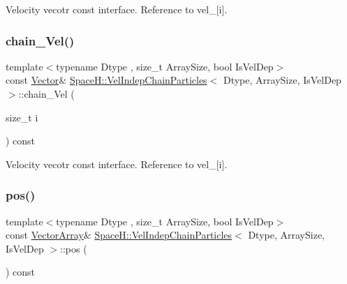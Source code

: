 Velocity vecotr const interface. Reference to vel\+\_\+\mbox{[}i\mbox{]}. 

\mbox{\label{class_space_h_1_1_vel_indep_chain_particles_a05d9529a4ee452b4c15efe92584a6d25}} 
\subsubsection{\texorpdfstring{chain_\+Vel()}{chainVel()}\hspace{0.1cm}{\footnotesize\ttfamily [4/4]}}
{\footnotesize\ttfamily template$<$typename Dtype , size\+\_\+t Array\+Size, bool Is\+Vel\+Dep$>$ \\
const \mbox{\hyperlink{class_space_h_1_1_vel_indep_particles_a61bbcfdb0dc7f99f3c68af69a755c935}{Vector}}\& \mbox{\hyperlink{class_space_h_1_1_vel_indep_chain_particles}{Space\+H\+::\+Vel\+Indep\+Chain\+Particles}}$<$ Dtype, Array\+Size, Is\+Vel\+Dep $>$\+::chain_\+Vel (\begin{DoxyParamCaption}\item[{size\+\_\+t}]{i }\end{DoxyParamCaption}) const\hspace{0.3cm}{\ttfamily [inline]}}



Velocity vecotr const interface. Reference to vel\+\_\+\mbox{[}i\mbox{]}. 

\mbox{\label{class_space_h_1_1_vel_indep_chain_particles_adaa5317f0c4a09c847d830de1691d156}} 
\subsubsection{\texorpdfstring{pos()}{pos()}\hspace{0.1cm}{\footnotesize\ttfamily [1/2]}}
{\footnotesize\ttfamily template$<$typename Dtype , size\+\_\+t Array\+Size, bool Is\+Vel\+Dep$>$ \\
const \mbox{\hyperlink{class_space_h_1_1_vel_indep_particles_aa9983058940249df8b00fa800e8cbad2}{Vector\+Array}}\& \mbox{\hyperlink{class_space_h_1_1_vel_indep_chain_particles}{Space\+H\+::\+Vel\+Indep\+Chain\+Particles}}$<$ Dtype, Array\+Size, Is\+Vel\+Dep $>$\+::pos (\begin{DoxyParamCaption}{ }\end{DoxyParamCaption}) const\hspace{0.3cm}{\ttfamily [inline]}}



